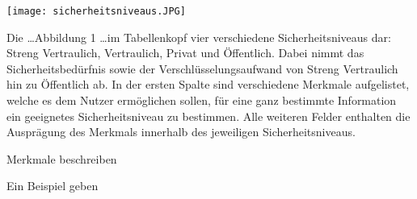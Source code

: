 \texttt{[image: sicherheitsniveaus.JPG]}

Die \dots Abbildung 1 \dots im Tabellenkopf vier verschiedene Sicherheitsniveaus dar: Streng Vertraulich, Vertraulich, Privat und Öffentlich. Dabei nimmt das Sicherheitsbedürfnis sowie der Verschlüsselungsaufwand von Streng Vertraulich hin zu Öffentlich ab.
In der ersten Spalte sind verschiedene Merkmale aufgelistet, welche es dem Nutzer ermöglichen sollen, für eine ganz bestimmte Information ein geeignetes Sicherheitsniveau zu bestimmen.
Alle weiteren Felder enthalten die Ausprägung des Merkmals innerhalb des jeweiligen Sicherheitsniveaus.


Merkmale beschreiben

Ein Beispiel geben

